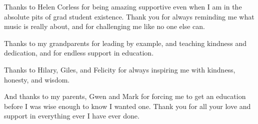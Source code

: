 \begin{fullwidth}
Thanks to Helen Corless for being amazing supportive even when I am in
the absolute pits of grad student existence. Thank you for always
reminding me what music is really about, and for challenging me like
no one else can.

Thanks to my grandparents for leading by example, and teaching
kindness and dedication, and for endless support in education.

Thanks to Hilary, Giles, and Felicity for always inspiring me with
kindness, honesty, and wisdom. 

And thanks to my parents, Gwen and Mark for forcing me to get an
education before I was wise enough to know I wanted one. Thank you for
all your love and support in everything ever I have ever done.
\end{fullwidth}
